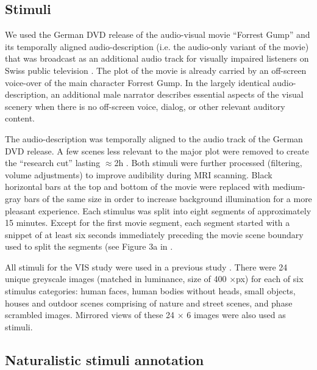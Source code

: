 \documentclass[english]{article}
\begin{document}
\subsection{Stimuli}
We used the German DVD release \citep{ForrestGumpDVD} of the audio-visual movie
``Forrest Gump'' \citep{ForrestGumpMovie} and its temporally aligned
audio-description (i.e. the audio-only variant of the movie) that was broadcast
as an additional audio track for visually impaired listeners on Swiss public
television \citep{ForrestGumpGermanAD}.
The plot of the movie is already carried by an off-screen voice-over of the main
character Forrest Gump. In the largely identical audio-description, an
additional male narrator describes essential aspects of the visual scenery when
there is no off-screen voice, dialog, or other relevant auditory content.

The audio-description was temporally aligned to the audio track of the German
DVD release. A few scenes less relevant to the major plot were removed to create
the ``research cut'' lasting $\approx$2h \citep{hanke2014audiomovie,
hanke2016simultaneous}.
Both stimuli were further processed (filtering, volume adjustments) to improve
audibility during MRI scanning. Black horizontal bars at the top and bottom of
the movie were replaced with medium-gray bars of the same size in order to
increase background illumination for a more pleasant experience.
Each stimulus was split into eight segments of approximately 15 minutes. Except
for the first movie segment, each segment started with a snippet of at least six
seconds immediately preceding the movie scene boundary used to split the
segments (see Figure 3a in \citep{hanke2014audiomovie}.

All stimuli for the VIS study were used in a previous study
\citep{haxby2011common}. There were 24 unique greyscale images (matched in
luminance, size of 400 $\times$\unit[400]{px}) for each of six stimulus
categories: human faces, human bodies without heads, small objects, houses and
outdoor scenes comprising of nature and street scenes, and phase scrambled
images. Mirrored views of these 24 $\times$ 6 images were also used as stimuli.

\subsection{Naturalistic stimuli annotation}
\end{document}
